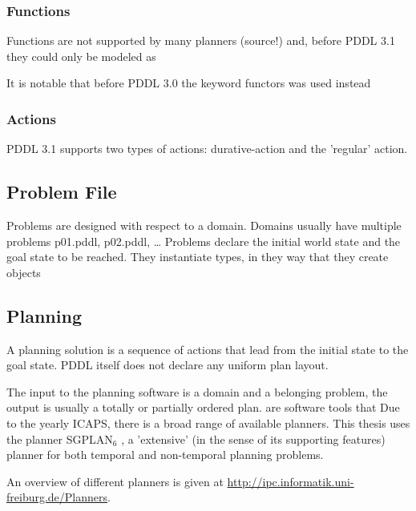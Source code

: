 \documentclass[11pt]{article}
\begin{document}
\subsubsection{Functions}
\label{sec-3-1-4}
Functions are not supported by many planners (source!) and, before
PDDL 3.1 they could only be modeled as 

It is notable that before PDDL 3.0 the keyword functors was used instead
\subsubsection{Actions}
\label{sec-3-1-5}
PDDL 3.1 supports two types of actions: durative-action and the
'regular' action.
\subsection{Problem File}
\label{sec-3-2}

Problems are designed with respect to a domain. Domains usually have
multiple problems p01.pddl, p02.pddl, \ldots{} Problems declare the initial
world state and the goal state to be reached. They instantiate types,
in they way that they create objects 
\subsection{Planning}
\label{sec-3-3}

A planning solution is a sequence of actions that lead from the
initial state to the goal state. PDDL itself does not declare any
uniform plan layout.

The input to the planning software is a domain and a belonging
problem, the output is usually a totally or partially ordered plan.
are software tools that Due to the yearly ICAPS, there is a broad
range of available planners. This thesis uses the planner SGPLAN\(_{\text{6}}\)
\textcite{hsu2008sgplan}, a 'extensive' (in the sense of its
supporting features) planner for both temporal and non-temporal
planning problems.

An overview of different planners is given at
\url{http://ipc.informatik.uni-freiburg.de/Planners}.
\end{document}
